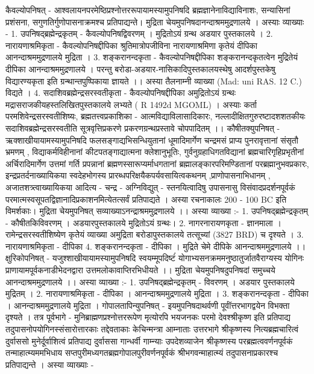 कैवल्योपनिषत् - 
आश्वलायनपरमेष्ठिप्रश्नोत्तररूपायामस्यामुपनिषदि ब्रह्मज्ञानेनाविद्याविनाशः, सन्यासिनां प्रशंसना, सगुणतिर्गुणोपासनाक्रमश्च प्रतिपाद्यन्ते। मुद्रिता चेयमुपनिषदानन्दाश्रममुद्रणालये । अस्याः व्याख्याः - 
1. उपनिषद्ब्रह्मेन्द्रकृतम् - कैवल्योपनिषद्विवरणम् । मुद्रितोऽयं ग्रन्थ अडयार पुस्तकालये । 
2. नारायणाश्रमिकृता - कैवल्योपनिषद्दीपिका 
श्रुतिमात्रोपजीविना नारायणाश्रमिणा कृतेयं दीपिका आनन्दाश्रममुद्रणालये मुद्रिता । 
3. शङ्करानन्दकृता - कैवल्योपनिषद्दीपिका 
शङ्करानन्दकृतत्वेन मुद्रितेयं दीपिका आनन्दाश्रममुद्रणालये । परन्तु बरोडा-अडयार-नासिकादिपुस्तकालयस्थेषु आदर्शपुस्तकेषु विद्यारण्यकृता इति ग्रन्थान्तपुष्पिकाया ज्ञायते ।। अस्या तैलनाम्नी व्याख्या (Mad: uni RAS. 12 C.) विद्यते ।
4. सदाशिवब्रह्मेन्द्रसरस्वतीकृता - कैवल्योपनिषद्दीपिका 
अमुद्रितोऽयं ग्रन्थः मद्रासराजकीयहस्तलिखितपुस्तकालये लभ्यते ( R 1492d MGOML) ।
अस्याः कर्ता परमशिवेन्द्रसरस्वतीशिष्यः, ब्रह्मतत्त्वप्रकाशिका - आत्मविद्याविलासादिकारः, नल्लादीक्षितगुरुरष्टादशशतकीयः सदाशिवब्रह्मेन्द्रसरस्वतीति सूत्रवृत्तिप्रकरणे प्रकरणग्रन्थप्रस्तावे चोपपादितम् ।। 
कौषीतक्युपनिषत् - 
ऋक्शाखीयायामस्यामुपनिषदि फलसङ्गाद्यभिसन्धियुतानां धूमादिमार्गेण चन्द्रमसं प्राप्य पुनरावृत्तानां संसृतौ भ्रमणम् , विद्याकर्मविहीनानां कीटपतङ्गाद्यात्मना क्लेशानुभूतिः, गुर्वनुग्रहाधिगतविद्यानां ब्रह्मचारिगृहिप्रभृतीनां अर्चिरादिमार्गेण उत्तमां गर्ति प्रपन्नानां ब्रह्मणस्सारूप्यर्माधगतानां ब्रह्मालङ्कारपरिमण्डितानां परब्रह्मानुभवप्रकारः, इन्द्रप्रतर्दनाख्यायिकया स्वदेहभोगस्य प्रारब्धपरिक्षयैकपर्यवसायित्वकथनम् ,प्राणोपासनाभिधानम् , अजातशत्र्त्वाख्यायिकया आदित्य - चन्द्र - अग्निविद्युत् - स्तनयित्वादिषु उपासनासु विसंवादप्रदर्शनपूर्वकं परमात्मस्वसूपतद्विज्ञानादिप्रकाशनमित्येतत्सर्वं प्रतिपाद्यते । अस्या रचनाकालः 200 - 100 BC  इति विमर्शकाः। मुद्रिता चेयमुपनिषत् सव्याख्याऽनन्द्राश्रममुद्रणालये ।। अस्या व्याख्या :-
1. उपनिषद्ब्रह्मेन्द्रकृतम् - कौषीतकिविवरणम् । अडयारपुस्तकालये मुद्रितोऽयं ग्रन्थः। 
2. नागरनारायणकृता - ज्ञानमाला । रामेन्द्रसरस्वतीशिष्येण कृतेेयं व्याख्या अमुद्रिता बरोडापुस्तकालये तत्सूच्यां (3827 BRD) च दृश्यते । 
3. नारायणाश्रमिकृता - दीपिका 
4. शङ्करानन्दकृता - दीपिका । मुद्रिते चेमे दीपिके आनन्दाश्रममुद्रणालये ।।
क्षुरिकोपनिषत् - 
यजुश्शाखीयायामस्यामुपनिषदि स्वयम्मूपदिष्टंं योगाभ्यसनक्रममनुष्ठातुर्जातवैराग्यस्य योगिनः प्राणायामपूर्वकनाडीभेदनद्वारा उत्तमलोकावाप्तिरभिधीयते ।। मुद्रिता चेयमुपनिषदुपनिषदां समुच्चये आनन्दाश्रममुद्रणालये ।। अस्या व्याख्या :-
1. उपनिषद्ब्रह्मेन्द्रकृतम् - विवरणम् । अडयार पुस्तकालये मुद्रितम् ।
2. नारायणाश्रमिकृता - दीपिका । आनन्दाश्रममुद्रणालये मुद्रिता ।
3. शङ्करानन्दकृता - दीपिका । आनन्दाश्रममुद्रणालये मुद्रिता । 
गोपालतापिन्युपनिषत् - 
इयमुपनिषदाथर्वणी पूर्वॉत्तरभागद्वयेन विभक्ता दृश्यते । तत्र पूर्वभागे - मुनिब्राह्मणप्रश्नोत्तररूपेण मृत्योरपि भयजनकः परमो देवश्श्रीकृष्ण इति प्रतिपाद्य तदुपासनोपयोगिनस्संसारोत्तारकाः तद्देवताकाः केचिन्मन्त्रा आम्नाताः उत्तरभागे श्रीकृष्णस्य नित्यब्रह्मचारित्वं दुर्वाससो मुनेर्दूर्वाशित्वं प्रतिपाद्य दुर्वाससा गान्धर्वी गाम्न्याः उपदेशव्याजेन श्रीकृष्णस्य परब्रह्मत्ववर्णनपूर्वकं तन्माहात्म्यममभिधाय सप्तपुरीमध्यगतब्रह्मगोपालपुरीवर्णनपूर्वकं श्रीभगवन्माहात्म्यं  तदुपासनाप्रकारश्च प्रतिपाद्यन्ते । अस्या व्याख्याः - 
